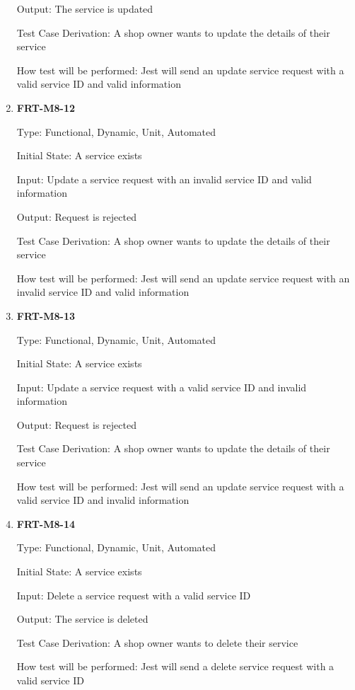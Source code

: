\documentclass[12pt, titlepage]{article}
\begin{document}
\begin{enumerate}
	      Output: The service is updated

	      Test Case Derivation: A shop owner wants to update the details of their service

	      How test will be performed: Jest will send an update service request with a valid service ID and
	      valid information

	\item \textbf{FRT-M8-12}

	      Type: Functional, Dynamic, Unit, Automated

	      Initial State: A service exists

	      Input: Update a service request with an invalid service ID and valid information

	      Output: Request is rejected

	      Test Case Derivation: A shop owner wants to update the details of their service

	      How test will be performed: Jest will send an update service request with an invalid service ID and
	      valid information

	\item \textbf{FRT-M8-13}

	      Type: Functional, Dynamic, Unit, Automated

	      Initial State: A service exists

	      Input: Update a service request with a valid service ID and invalid information

	      Output: Request is rejected

	      Test Case Derivation: A shop owner wants to update the details of their service

	      How test will be performed: Jest will send an update service request with a valid service ID and
	      invalid information

	\item \textbf{FRT-M8-14}

	      Type: Functional, Dynamic, Unit, Automated

	      Initial State: A service exists

	      Input: Delete a service request with a valid service ID

	      Output: The service is deleted

	      Test Case Derivation: A shop owner wants to delete their service

	      How test will be performed: Jest will send a delete service request with a valid service ID


\end{enumerate}
\end{document}
